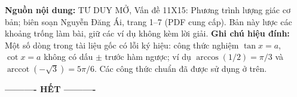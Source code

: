 \documentclass[11pt,a4paper]{article}
\begin{document}
\vspace{3mm}
\begin{tcolorbox}[colback=white,colframe=black!35,boxrule=.4pt,arc=0mm,
 left=2mm,right=2mm,top=1mm,bottom=1mm]
\footnotesize
\textbf{Nguồn nội dung:} TƯ DUY MỞ, Vấn đề 11X15: Phương trình lượng giác cơ bản;
biên soạn Nguyễn Đăng Ái, trang 1--7 (PDF cung cấp).
Bản này lược các khoảng trống làm bài, giữ các ví dụ không kèm lời giải.
\textbf{Ghi chú hiệu đính:} Một số dòng trong tài liệu gốc có lỗi ký hiệu:
công thức nghiệm $\tan x=a$, $\cot x=a$ không có dấu $\pm$ trước hàm ngược;
ví dụ $\arccos(1/2)=\pi/3$ và $\operatorname{arccot}(-\sqrt3)=5\pi/6$.
Các công thức chuẩn đã được sử dụng ở trên.
\end{tcolorbox}
\vspace{3mm}
\begin{center}\textbf{---------- HẾT ----------}\end{center}
\end{document}
